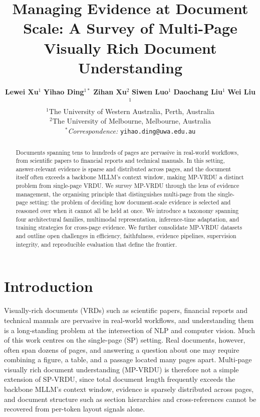\documentclass[11pt]{article}
\title{Managing Evidence at Document Scale: A Survey of Multi-Page Visually Rich Document Understanding}
\author{
  \textbf{Lewei Xu}$^{1}$ \quad \textbf{Yihao Ding}$^{1*}$ \quad \textbf{Zihan Xu}$^2$ \quad
  \textbf{Siwen Luo}$^1$ \quad \textbf{Daochang Liu}$^1$ \quad \textbf{Wei Liu}$^1$ \\[4pt]
  $^1$The University of Western Australia, Perth, Australia \\[2pt]
  $^2$The University of Melbourne, Melbourne, Australia \\[2pt]
  $^*$\textit{Correspondence:}
  \texttt{yihao.ding@uwa.edu.au}
}
\begin{document}
\maketitle
\begin{abstract}
Documents spanning tens to hundreds of pages are pervasive in real-world workflows, from scientific papers to financial reports and technical manuals. In this setting, answer-relevant evidence is sparse and distributed across pages, and the document itself often exceeds a backbone MLLM's context window, making MP-VRDU a distinct problem from single-page VRDU. We survey MP-VRDU through the lens of evidence management, the organising principle that distinguishes multi-page from the single-page setting: the problem of deciding how document-scale evidence is selected and reasoned over when it cannot all be held at once. We introduce a taxonomy spanning four architectural families, multimodal representation, inference-time adaptation, and training strategies for cross-page evidence. We further consolidate MP-VRDU datasets and outline open challenges in efficiency, faithfulness, evidence pipelines, supervision integrity, and reproducible evaluation that define the frontier.

\end{abstract}



\section{Introduction}
Visually-rich documents (VRDs) such as scientific papers, financial reports and technical manuals are pervasive in real-world workflows, and understanding them is a long-standing problem at the intersection of NLP and computer vision. Much of this work centres on the single-page (SP) setting. Real documents, however, often span dozens of pages, and answering a question about one may require combining a figure, a table, and a passage located many pages apart. Multi-page visually rich document understanding (MP-VRDU) is therefore not a simple extension of SP-VRDU, since total document length frequently exceeds the backbone MLLM's context window, evidence is sparsely distributed across pages, and document structure such as section hierarchies and cross-references cannot be recovered from per-token layout signals alone.
\end{document}

